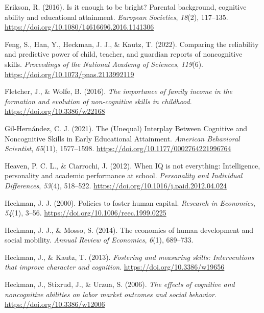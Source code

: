 \documentclass[
  12pt,
  a4paper,
]{article}
\newlength{\cslhangindent}
\newlength{\cslentryspacingunit} %
\newenvironment{CSLReferences}[2] %
 {%
  \setlength{\parindent}{0pt}
  \ifodd #1
  \let\oldpar\par
  \def\par{\hangindent=\cslhangindent\oldpar}
  \fi
  \setlength{\parskip}{#2\cslentryspacingunit}
 }%
 {}
\begin{document}
\begin{CSLReferences}{1}{0}
\leavevmode{}%
Erikson, R. (2016). Is it enough to be bright? Parental background,
cognitive ability and educational attainment. \emph{European Societies},
\emph{18}(2), 117--135.
\url{https://doi.org/10.1080/14616696.2016.1141306}

\leavevmode{}%
Feng, S., Han, Y., Heckman, J. J., \& Kautz, T. (2022). Comparing the
reliability and predictive power of child, teacher, and guardian reports
of noncognitive skills. \emph{Proceedings of the National Academy of
Sciences}, \emph{119}(6). \url{https://doi.org/10.1073/pnas.2113992119}

\leavevmode{}%
Fletcher, J., \& Wolfe, B. (2016). \emph{The importance of family income
in the formation and evolution of non-cognitive skills in childhood}.
\url{https://doi.org/10.3386/w22168}

\leavevmode{}%
Gil-Hernández, C. J. (2021). The (Unequal) Interplay Between Cognitive
and Noncognitive Skills in Early Educational Attainment. \emph{American
Behavioral Scientist}, \emph{65}(11), 1577--1598.
\url{https://doi.org/10.1177/0002764221996764}

\leavevmode{}%
Heaven, P. C. L., \& Ciarrochi, J. (2012). When IQ is not everything:
Intelligence, personality and academic performance at school.
\emph{Personality and Individual Differences}, \emph{53}(4), 518--522.
\url{https://doi.org/10.1016/j.paid.2012.04.024}

\leavevmode{}%
Heckman, J. J. (2000). Policies to foster human capital. \emph{Research
in Economics}, \emph{54}(1), 3--56.
\url{https://doi.org/10.1006/reec.1999.0225}

\leavevmode{}%
Heckman, J. J., \& Mosso, S. (2014). The economics of human development
and social mobility. \emph{Annual Review of Economics}, \emph{6}(1),
689--733.

\leavevmode{}%
Heckman, J., \& Kautz, T. (2013). \emph{Fostering and measuring skills:
Interventions that improve character and cognition}.
\url{https://doi.org/10.3386/w19656}

\leavevmode{}%
Heckman, J., Stixrud, J., \& Urzua, S. (2006). \emph{The effects of
cognitive and noncognitive abilities on labor market outcomes and social
behavior}. \url{https://doi.org/10.3386/w12006}


\end{CSLReferences}
\end{document}
